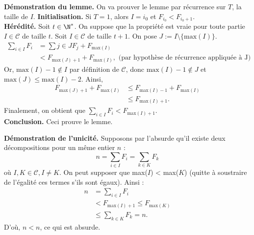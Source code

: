 \begin{Soln}{50}
\textbf{Démonstration du lemme.}
On va prouver le lemme par récurrence sur $T$, la taille de $I$.
\textbf{Initialisation.} Si $T = 1$, alors $I = {i_0}$ et $F_{i_0} < F_{i_0 + 1}$.\\
\textbf{Hérédité.} Soit $t \in \N^*$. On suppose que la propriété est vraie pour toute partie $I \in \mathcal{C}$ de taille $t$.
Soit $I \in \mathcal C$ de taille $t + 1$. On pose $J := I\setminus\{\text{max}(I)\}$.
\begin{align*}
\sum_{i \in I} F_i &= \sum{j \in J} F_j + F_{\text{max}(I)}\\
		  & < F_{\text{max}(J) +1} + F_{\text{max}(I)},\text{ (par hypothèse de récurrence appliquée à J)}
\end{align*}
Or, $\text{max}(I) -1 \notin I$ par définition de $\mathcal{C}$, donc $\text{max}(I) -1 \notin J$ et $\text{max}(J) \leq \text{max}(I) -2$. Ainsi,
\begin{align*}
F_{\text{max}(J) +1} + F_{\text{max}(I)} & \leq F_{\text{max}(I) -1} + F_{\text{max}(I)} \\
 & \leq F_{\text{max}(I)+1}.
\end{align*}
Finalement, on obtient que $\sum_{i \in I} F_i < F_{\text{max}(I)+1}$.\\
\textbf{Conclusion.} Ceci prouve le lemme.

\textbf{Démonstration de l'unicité.}
Supposons par l'absurde qu'il existe deux décompositions pour un même entier $n$ :
$$ n = \sum_{i \in I} F_i = \sum_{k \in K} F_k $$
où $I, K \in \mathcal C, I \neq K$.
On peut supposer que max($I$) < max($K$) (quitte à soustraire de l'égalité ces termes s'ils sont égaux). Ainsi :
\begin{align*}
n & = \sum_{i \in I} F_i \\
  & < F_{\text{max}(I)+1} \leq F_{\text{max}(K)} \\
  & \leq \sum_{k \in K} F_k = n.
\end{align*}
D'où, $n < n$, ce qui est absurde.
\end{Soln}
